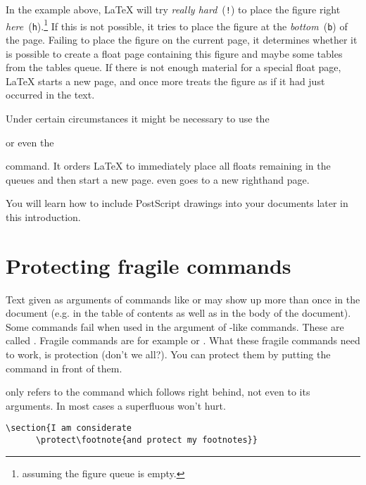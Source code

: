\noindent In the example above, 
\LaTeX{} will try \emph{really hard}~(\texttt{!}) to place the figure
right \emph{here}~(\texttt{h}).\footnote{assuming the figure queue is
  empty.} If this is not possible, it tries to place the figure at the
\emph{bottom}~(\texttt{b}) of the page.  Failing to place the figure
on the current page, it determines whether it is possible to create a float
page containing this figure and maybe some tables from the tables
queue. If there is not enough material for a special float page,
\LaTeX{} starts a new page, and once more treats the figure as if it
had just occurred in the text.

Under certain circumstances it might be necessary to use the 

\begin{lscommand}
 or even the  
\end{lscommand}

\noindent command. It orders \LaTeX{} to immediately place all 
floats remaining in the queues and then start a new
page.  even goes to a new righthand page.

You will learn how to include PostScript
drawings into your \LaTeXe{} documents later in this introduction.

\section{Protecting fragile commands}

Text given as arguments of commands like  or  may
show up more than once in the document (e.g. in the table of contents as
well as in the body of the document). Some commands fail when used in the
argument of -like commands. These are called .
Fragile commands are for example  or . What these
fragile commands need to work, is protection (don't we all?). You can
protect them by putting the  command in front of them.

 only refers to the command which follows right behind, not even
to its arguments. In most cases a superfluous  won't hurt.

\begin{code}
\verb|\section{I am considerate|\\
\verb|      \protect\footnote{and protect my footnotes}}|
\end{code}



